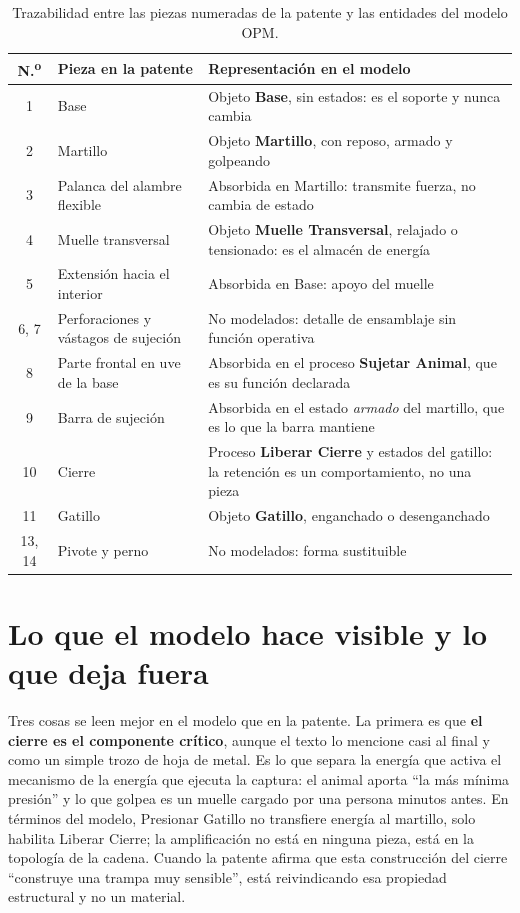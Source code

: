 \documentclass[11pt,letterpaper]{article}
\begin{document}
\begin{table}[ht]
  \centering
  \small
  \caption{Trazabilidad entre las piezas numeradas de la patente y las entidades
  del modelo OPM.}
  \label{tab:trazabilidad}
  \begin{tabularx}{\textwidth}{@{}c
    >{\raggedright\arraybackslash}p{}
    >{\raggedright\arraybackslash}X@{}}
    \toprule
    \textbf{N.\textsuperscript{o}} & \textbf{Pieza en la patente} &
    \textbf{Representación en el modelo} \\
    \midrule
    1 & Base & Objeto \textbf{Base}, sin estados: es el soporte y nunca cambia \\
    2 & Martillo & Objeto \textbf{Martillo}, con reposo, armado y golpeando \\
    3 & Palanca del alambre flexible & Absorbida en Martillo: transmite fuerza,
      no cambia de estado \\
    4 & Muelle transversal & Objeto \textbf{Muelle Transversal}, relajado o
      tensionado: es el almacén de energía \\
    5 & Extensión hacia el interior & Absorbida en Base: apoyo del muelle \\
    6, 7 & Perforaciones y vástagos de sujeción & No modelados: detalle de
      ensamblaje sin función operativa \\
    8 & Parte frontal en uve de la base & Absorbida en el proceso
      \textbf{Sujetar Animal}, que es su función declarada \\
    9 & Barra de sujeción & Absorbida en el estado \emph{armado} del martillo,
      que es lo que la barra mantiene \\
    10 & Cierre & Proceso \textbf{Liberar Cierre} y estados del gatillo:
      la retención es un comportamiento, no una pieza \\
    11 & Gatillo & Objeto \textbf{Gatillo}, enganchado o desenganchado \\
    13, 14 & Pivote y perno & No modelados: forma sustituible \\
    \bottomrule
  \end{tabularx}
\end{table}

\section*{Lo que el modelo hace visible y lo que deja fuera}

Tres cosas se leen mejor en el modelo que en la patente. La primera es que
\textbf{el cierre es el componente crítico}, aunque el texto lo mencione casi al
final y como un simple trozo de hoja de metal. Es lo que separa la energía que
activa el mecanismo de la energía que ejecuta la captura: el animal aporta
\enquote{la más mínima presión} y lo que golpea es un muelle cargado por una
persona minutos antes. En términos del modelo, Presionar Gatillo no transfiere
energía al martillo, solo habilita Liberar Cierre; la amplificación no está en
ninguna pieza, está en la topología de la cadena. Cuando la patente afirma que
esta construcción del cierre \enquote{construye una trampa muy sensible}, está
reivindicando esa propiedad estructural y no un material.
\end{document}
